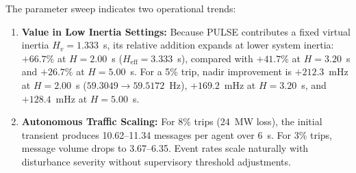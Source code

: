 \documentclass[preprint,12pt]{elsarticle}
\begin{document}
\begin{table}[tbp]
\centering
\caption{Multi-contingency sensitivity sweep across grid inertia regimes (6.0~s evaluation).}\label{tab:exp_a_sweep}
\end{table}

The parameter sweep indicates two operational trends:
\begin{enumerate}
    \item \textbf{Value in Low Inertia Settings:} Because PULSE contributes a fixed virtual inertia $H_v = 1.333$~s, its relative addition expands at lower system inertia: $+66.7\%$ at $H = 2.00$~s ($H_{\mathrm{eff}} = 3.333$~s), compared with $+41.7\%$ at $H=3.20$~s and $+26.7\%$ at $H=5.00$~s. For a 5\% trip, nadir improvement is $+212.3$~mHz at $H=2.00$~s ($59.3049 \to 59.5172$~Hz), $+169.2$~mHz at $H=3.20$~s, and $+128.4$~mHz at $H=5.00$~s.
    \item \textbf{Autonomous Traffic Scaling:} For 8\% trips (24~MW loss), the initial transient produces 10.62--11.34 messages per agent over 6~s. For 3\% trips, message volume drops to 3.67--6.35. Event rates scale naturally with disturbance severity without supervisory threshold adjustments.
\end{enumerate}
\end{document}
